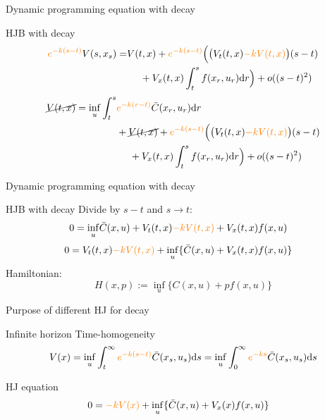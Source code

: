 \documentclass[color=usenames,dvipsnames]{beamer}
\newcommand{\ds}{\text{\normalfont d}s}
\newcommand{\dr}{\text{\normalfont d}r}
\begin{document}
\begin{frame}{Dynamic programming equation with decay}
        \begin{block}
        {HJB with decay}
        \[
        \begin{split}
             {\color{orange}e^{-k(s-t)}}V(s,x_s) = &V(t,x) + {\color{orange}e^{-k(s-t)}}\Big(\big(V_t(t,x) {\color{orange}- k V(t,x)}\big)(s-t)\\
             &~~~~+ V_x(t,x)\int_t^s f(x_r,u_r)\dr\Big) + o((s-t)^2)
        \end{split}
        \]
        \[
        \begin{split}
            \cancel{V(t,x)}=\inf_{u}\int_t^s &{\color{orange}e^{-k(r-t)}}\bar{C}(x_r,u_r)\dr \\
            &+ \cancel{V(t,x)} + {\color{orange}e^{-k(s-t)}}\Big(\big(V_t(t,x) {\color{orange}- k V(t,x)}\big)(s-t)\\
             &~~~~+ V_x(t,x)\int_t^s f(x_r,u_r)\dr\Big) + o((s-t)^2)
        \end{split}
        \]
    \end{block}
\end{frame}

\begin{frame}{Dynamic programming equation with decay}
        \begin{block}
        {HJB with decay}
        Divide by $s-t$ and $s\to t$:
        \[
        \begin{split}
            0=\inf_{u} &\bar{C}(x,u) + V_t(t,x) {\color{orange}- k V(t,x)}+ V_x(t,x)f(x,u)
        \end{split}
        \]
        \[
        \begin{split}
            0= V_t(t,x) {\color{orange}- k V(t,x)}+\inf_{u} &\{\bar{C}(x,u) + V_x(t,x)f(x,u)\}
        \end{split}
        \]
        Hamiltonian: 
        \[
        H(x,p):= \inf_{u} \{C(x,u) + pf(x,u)\}
        \]
    \end{block}
\end{frame}
\begin{frame}{Purpose of different HJ for decay}
    \begin{block}
        {Infinite horizon}
        Time-homogeneity
        \[
        V(x)=\inf_{u}\int_t^\infty {\color{orange}e^{-k(s-t)}}\bar{C}(x_s,u_s)\ds=\inf_{u}\int_0^\infty {\color{orange}e^{-ks}}\bar{C}(x_s,u_s)\ds
        \]
    \end{block}
    \begin{block}
        {HJ equation}
        \[
        \begin{split}
            0= {\color{orange}- k V(x)}+\inf_{u} &\{\bar{C}(x,u) + V_x(x)f(x,u)\}
        \end{split}
        \]
    \end{block}
\end{frame}
\end{document}
